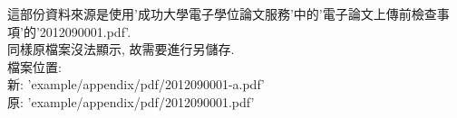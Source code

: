 
這部份資料來源是使用'成功大學電子學位論文服務'中的'電子論文上傳前檢查事項'的'2012090001.pdf'.\\

同樣原檔案沒法顯示, 故需要進行另儲存.\\

\noindent 檔案位置:\\
\noindent 新: 'example/appendix/pdf/2012090001-a.pdf'\\
\noindent 原: 'example/appendix/pdf/2012090001.pdf'\\



\EndChapter
